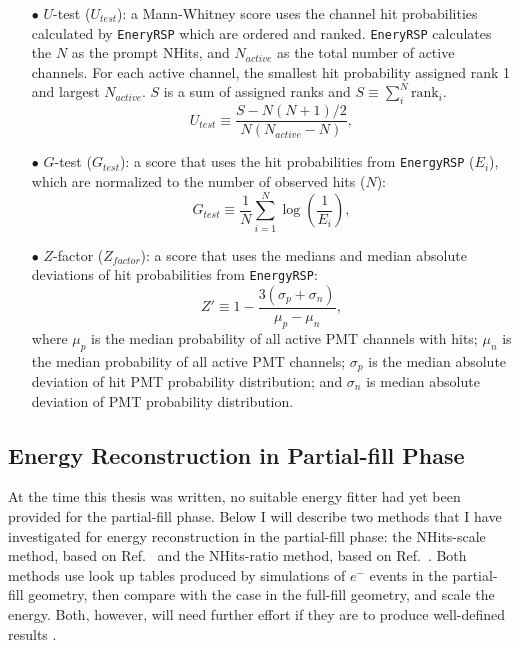 \begin{itemize}
	\item[$\bullet$]$U$-test ($U_{test}$):
	a Mann-Whitney score uses the channel hit probabilities calculated by \texttt{EneryRSP} which are ordered and ranked. \texttt{EneryRSP} calculates the $N$ as the prompt NHits, and $N_{active}$ as the total number of active channels. For each active channel, the smallest hit probability assigned rank 1 and largest $N_{active}$. $S$ is a sum of assigned ranks and $S\equiv \sum_{i}^N \mathrm{rank}_i$.
	\begin{equation}
	U_{test}\equiv \frac{S-N(N+1)/2}{N(N_{active}-N)},
	\end{equation}

	\item[$\bullet$] $G$-test ($G_{test}$):
 	a score that uses the hit probabilities from \texttt{EnergyRSP} ($E_i$), which are normalized to the number of observed hits ($N$):
	\begin{equation}
	G_{test}\equiv \frac{1}{N}\sum_{i=1}^N \log(\frac{1}{E_i}),
	\end{equation}
	
	\item[$\bullet$] $Z$-factor ($Z_{factor}$):
	a score that uses the medians and median absolute deviations of hit probabilities from \texttt{EnergyRSP}:
	\begin{equation}
     Z'\equiv 1-\frac{3(\sigma_p+\sigma_n)}{\mu_p-\mu_n},
    \end{equation}
    where $\mu_p$ is the median probability of all active PMT channels with hits; $\mu_n$ is the median probability of all active PMT channels; $\sigma_p$ is the median absolute deviation of hit PMT probability distribution; and
    $\sigma_n$ is median absolute deviation of PMT probability distribution.
\end{itemize}

\subsection{Energy Reconstruction in Partial-fill Phase}

At the time this thesis was written, no suitable energy fitter had yet been provided for the partial-fill phase. Below I will describe two methods that I have investigated for energy reconstruction in the partial-fill phase: the NHits-scale method, based on Ref.~\cite{partialEnergy} and the NHits-ratio method, based on Ref.~\cite{partialEnergyYang}. Both methods use look up tables produced by simulations of $e^-$ events in the partial-fill geometry, then compare with the case in the full-fill geometry, and scale the energy. Both, however, will need further effort if they are to produce well-defined results \cite{jiePartialEnergy,jiePartialEnergyNhitRatio}.

